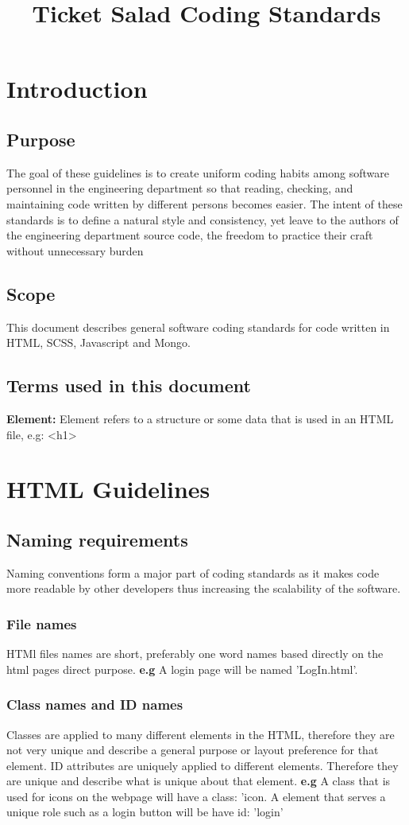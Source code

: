 \documentclass[11pt]{article}
\begin{document}
	\title{Ticket Salad Coding Standards}
	\date{}
	\maketitle
	\tableofcontents
	\newpage
	
	\section{Introduction}
	\subsection{Purpose}
	The goal of these guidelines is to create uniform coding habits among software personnel in the
	engineering department so that reading, checking, and maintaining code written by different persons
	becomes easier. The intent of these standards is to define a natural style and consistency, yet leave
	to the authors of the engineering department source code, the freedom to practice their craft without
	unnecessary burden
	\subsection{Scope}
	This document describes general software coding standards for code written in HTML, SCSS, Javascript and Mongo.
	\subsection{Terms used in this document}
	\textbf{Element: }Element refers to a structure or some data that is used in an HTML file, e.g: <h1>
	\section{HTML Guidelines}
	\subsection{Naming requirements}
	Naming conventions form a major part of coding standards as it makes code more readable by other developers thus increasing the scalability of the software.
	\subsubsection{File names}
	HTMl files names are short, preferably one word names based directly on the html pages direct purpose.
	\textbf{e.g} A login page will be named 'LogIn.html'. 
	\subsubsection{Class names and ID names}
	Classes are applied to many different elements in the HTML, therefore they are not very unique and describe a general purpose or layout preference for that element.
	ID attributes are uniquely applied to different elements. Therefore they are unique and describe what is unique about that element. 
	\textbf{e.g} A class that is used for icons on the webpage will have a class: 'icon. A element that serves a unique role such as a login button will be have id: 'login'
\end{document}
